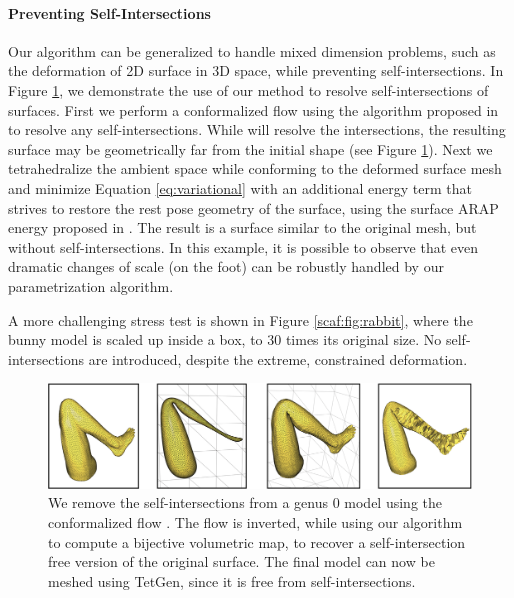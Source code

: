 \paragraph{Preventing Self-Intersections}
Our algorithm can be generalized to handle mixed dimension problems, such as the deformation of 2D surface in 3D space, while preventing self-intersections. In Figure \ref{scaf:fig:flow}, we demonstrate the use of our method to resolve self-intersections of surfaces. First we perform a conformalized flow \cite{Kazhdan:2012} using the algorithm proposed in \cite{Sacht:2013} to resolve any self-intersections.  While \cite{Sacht:2013} will resolve the intersections, the resulting surface may be geometrically far from the initial shape (see Figure \ref{scaf:fig:flow}).  Next we tetrahedralize the ambient space while conforming to the deformed surface mesh and minimize Equation \ref{eq:variational} with an additional energy term that strives to restore the rest pose geometry of the surface, using the surface ARAP energy proposed in \cite{Sorkine:2007}. The result is a surface similar to the original mesh, but without self-intersections. In this example, it is possible to observe that even dramatic changes of scale (on the foot) can be robustly handled by our parametrization algorithm.

A more challenging stress test is shown in Figure \ref{scaf:fig:rabbit}, where the bunny model is scaled up inside a box, to 30 times its original size. No self-intersections are introduced, despite the extreme, constrained deformation.

\begin{figure}[t]
\includegraphics[width=\columnwidth]{figs/leg-flow}
\caption{We remove the self-intersections from a genus 0 model using the conformalized flow \protect\cite{Kazhdan:2012,Sacht:2013}. The flow is inverted, while using our algorithm to compute a bijective volumetric map, to recover a self-intersection free version of the original surface. The final model can now be meshed using TetGen, since it is free from self-intersections.}
\vspace{-0.2cm}
\label{scaf:fig:flow}
\end{figure}

